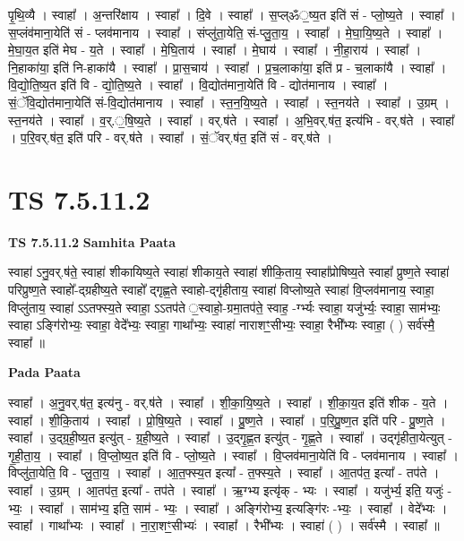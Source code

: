 \documentclass[17pt]{extarticle}
\begin{document}
पृ॒थि॒व्यै । स्वाहा᳚ । अ॒न्तरि॑क्षाय । स्वाहा᳚ । दि॒वे । स्वाहा᳚ । स॒प्ल्ॐ॒ष्य॒त इति॑ सं - प्लो॒ष्य॒ते । स्वाहा᳚ । स॒प्लंव॑माना॒येति॑ सं - प्लव॑मानाय । स्वाहा᳚ । संप्लु॑ता॒येति॒ सं-प्लु॒ता॒य॒ । स्वाहा᳚ । मे॒घा॒यि॒ष्य॒ते । स्वाहा᳚ । मे॒घा॒य॒त इति॑ मेघ - य॒ते । स्वाहा᳚ । मे॒घि॒ताय॑ । स्वाहा᳚ । मे॒घाय॑ । स्वाहा᳚ । नी॒हा॒राय॑ । स्वाहा᳚ । नि॒हाका॑या॒ इति॑ नि-हाका॑यै । स्वाहा᳚ । प्रा॒स॒चाय॑ । स्वाहा᳚ । प्र॒च॒लाका॑या॒ इति॑ प्र - च॒लाका॑यै । स्वाहा᳚ । वि॒द्यो॒ति॒ष्य॒त इति॑ वि - द्यो॒ति॒ष्य॒ते । स्वाहा᳚ । वि॒द्योत॑माना॒येति॑ वि - द्योत॑मानाय । स्वाहा᳚ । सं॒ॅवि॒द्योत॑माना॒येति॑ सं-वि॒द्योत॑मानाय । स्वाहा᳚ । स्त॒न॒यि॒ष्य॒ते । स्वाहा᳚ । स्त॒नय॑ते । स्वाहा᳚ । उ॒ग्रम् । स्त॒नय॑ते । स्वाहा᳚ । व॒र्.॒षि॒ष्य॒ते । स्वाहा᳚ । वर्.ष॑ते । स्वाहा᳚ । अ॒भि॒वर्.ष॑त॒ इत्य॑भि - वर्.ष॑ते । स्वाहा᳚ । प॒रि॒वर्.ष॑त॒ इति॑ परि - वर्.ष॑ते । स्वाहा᳚ । सं॒ॅवर्.ष॑त॒ इति॑ सं - वर्.ष॑ते ।  \newline





\section{ TS 7.5.11.2 }

\textbf{TS 7.5.11.2 } \newline
\textbf{Samhita Paata} \newline

स्वाहा॑ ऽनु॒वर्.ष॑ते॒ स्वाहा॑ शीकायिष्य॒ते स्वाहा॑ शीकाय॒ते स्वाहा॑ शीकि॒ताय॒ स्वाहा᳚प्रोषिष्य॒ते स्वाहा᳚ प्रुष्ण॒ते स्वाहा॑ परिप्रुष्ण॒ते स्वाहो᳚-द्ग्रहीष्य॒ते स्वाहो᳚ द्गृह्ण॒ते स्वाहो-द्गृ॑हीताय॒ स्वाहा॑ विप्लोष्य॒ते स्वाहा॑ वि॒प्लव॑मानाय॒ स्वाहा॒ विप्लु॑ताय॒ स्वाहा॑ ऽऽतफ्स्य॒ते स्वाहा॒ ऽऽतप॑ते ॒स्वाहो॒-ग्रमा॒तप॑ते॒ स्वाह॒ -र्ग्भ्यः स्वाहा॒ यजु॑र्भ्यः॒ स्वाहा॒ साम॑भ्यः॒ स्वाहा ऽङ्गि॑रोभ्यः॒ स्वाहा॒ वेदे᳚भ्यः॒ स्वाहा॒ गाथा᳚भ्यः॒ स्वाहा॑ नाराशꣳ॒॒सीभ्यः॒ स्वाहा॒ रैभी᳚भ्यः स्वाहा॒ ( ) सर्व॑स्मै॒ स्वाहा᳚ ॥ \newline

\textbf{Pada Paata} \newline

स्वाहा᳚ । अ॒नु॒वर्.ष॑त॒ इत्य॑नु - वर्.ष॑ते । स्वाहा᳚ । शी॒का॒यि॒ष्य॒ते । स्वाहा᳚ । शी॒का॒य॒त इति॑ शीक - य॒ते । स्वाहा᳚ । शी॒कि॒ताय॑ । स्वाहा᳚ । प्रो॒षि॒ष्य॒ते । स्वाहा᳚ । प्रु॒ष्ण॒ते । स्वाहा᳚ । प॒रि॒प्रु॒ष्ण॒त इति॑ परि - प्रु॒ष्ण॒ते । स्वाहा᳚ । उ॒द्ग्र॒ही॒ष्य॒त इत्यु॑त् - ग्र॒ही॒ष्य॒ते । स्वाहा᳚ । उ॒द्गृ॒ह्ण॒त इत्यु॑त् - गृ॒ह्ण॒ते । स्वाहा᳚ । उद्गृ॑हीता॒येत्युत् -   गृ॒ही॒ता॒य॒ । स्वाहा᳚ । वि॒प्लो॒ष्य॒त इति॑ वि - प्लो॒ष्य॒ते । स्वाहा᳚ । वि॒प्लव॑माना॒येति॑ वि - प्लव॑मानाय । स्वाहा᳚ । विप्लु॑ता॒येति॒ वि - प्लु॒ता॒य॒ । स्वाहा᳚ । आ॒त॒फ्स्य॒त इत्या᳚ - त॒फ्स्य॒ते । स्वाहा᳚ । आ॒तप॑त॒ इत्या᳚ - तप॑ते । स्वाहा᳚ । उ॒ग्रम् । आ॒तप॑त॒ इत्या᳚ - तप॑ते । स्वाहा᳚ । ऋ॒ग्भ्य इत्यृ॑क् - भ्यः । स्वाहा᳚ । यजु॑र्भ्य॒ इति॒ यजुः॑ - भ्यः॒ । स्वाहा᳚ । साम॑भ्य॒ इति॒ साम॑ - भ्यः॒ । स्वाहा᳚ । अङ्गि॑रोभ्य॒ इत्यङ्गि॑रः -भ्यः॒ । स्वाहा᳚ । वेदे᳚भ्यः । स्वाहा᳚ । गाथा᳚भ्यः । स्वाहा᳚ । ना॒रा॒शꣳ॒॒सीभ्यः॑ । स्वाहा᳚ । रैभी᳚भ्यः । स्वाहा॑ ( ) । सर्व॑स्मै । स्वाहा᳚ ॥  \newline
\end{document}
